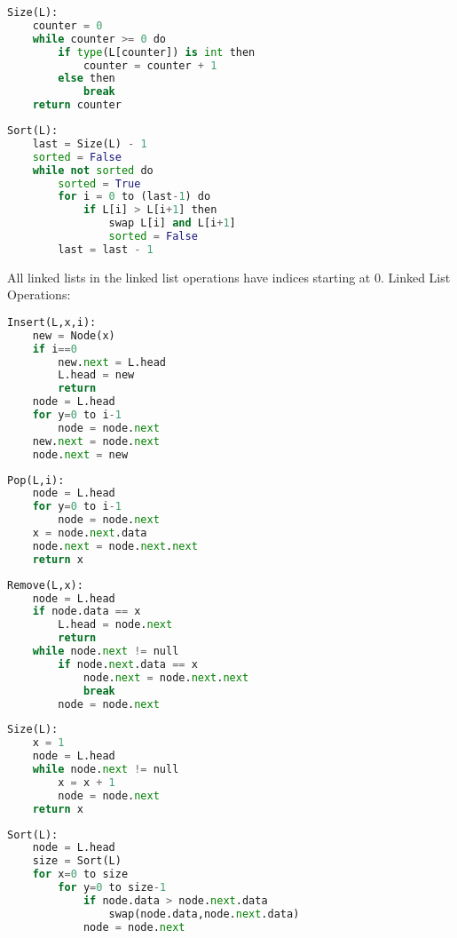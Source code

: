 \documentclass{article}
\begin{document}
\begin{enumerate}[label=(\alph*)]
\begin{lstlisting}[language=Python]
Size(L):
    counter = 0
    while counter >= 0 do
        if type(L[counter]) is int then
            counter = counter + 1
        else then
            break
    return counter
\end{lstlisting}

\begin{lstlisting}[language=Python]
Sort(L):
    last = Size(L) - 1
    sorted = False
    while not sorted do
        sorted = True
        for i = 0 to (last-1) do
            if L[i] > L[i+1] then
                swap L[i] and L[i+1]
                sorted = False
        last = last - 1
\end{lstlisting}

All linked lists in the linked list operations have indices starting at 0.
\newline Linked List Operations:
\begin{lstlisting}[language=Python]
Insert(L,x,i):
    new = Node(x)
    if i==0
        new.next = L.head
        L.head = new
        return
    node = L.head
    for y=0 to i-1
        node = node.next
    new.next = node.next
    node.next = new
\end{lstlisting}

\begin{lstlisting}[language=Python]
Pop(L,i):
    node = L.head
    for y=0 to i-1
        node = node.next
    x = node.next.data
    node.next = node.next.next
    return x
\end{lstlisting}

\begin{lstlisting}[language=Python]
Remove(L,x):
    node = L.head
    if node.data == x
        L.head = node.next
        return
    while node.next != null
        if node.next.data == x
            node.next = node.next.next
            break
        node = node.next
\end{lstlisting}

\begin{lstlisting}[language=Python]
Size(L):
    x = 1
    node = L.head
    while node.next != null
        x = x + 1
        node = node.next
    return x
\end{lstlisting}


\begin{lstlisting}[language=Python]
Sort(L):
    node = L.head
    size = Sort(L)
    for x=0 to size
        for y=0 to size-1
            if node.data > node.next.data
                swap(node.data,node.next.data)
            node = node.next
\end{lstlisting}


\end{enumerate}
\end{document}
